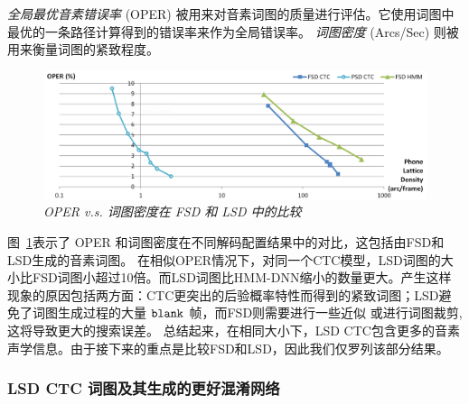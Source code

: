 {\em 全局最优音素错误率} (OPER) 被用来对音素词图的质量进行评估。它使用词图中最优的一条路径计算得到的错误率来作为全局错误率\cite{hoffmeister2006frame}。 {\em 词图密度} (Arcs/Sec) 则被用来衡量词图的紧致程度\cite{woodland1994large}。

\begin{figure}[tbhp!]
        \centering
        \includegraphics[width=\linewidth]{figure/OPER-latden.png}

        \caption{{\it OPER v.s. 词图密度在 FSD 和 LSD 中的比较}}
        \label{fig:OPER-latden}
      \end{figure}

图~\ref{fig:OPER-latden}表示了 OPER 和词图密度在不同解码配置结果中的对比，这包括由FSD和LSD生成的音素词图。
在相似OPER情况下，对同一个CTC模型，LSD词图的大小比FSD词图小超过10倍。而LSD词图比HMM-DNN缩小的数量更大。产生这样现象的原因包括两方面：CTC更突出的后验概率特性而得到的紧致词图；LSD避免了词图生成过程的大量 $\tt blank$ 帧，而FSD则需要进行一些近似 \cite{ljolje1999efficient} 或进行词图裁剪\cite{povey2012generating}, 这将导致更大的搜索误差。
总结起来，在相同大小下，LSD CTC包含更多的音素声学信息。由于接下来的重点是比较FSD和LSD，因此我们仅罗列该部分结果。


\subsubsection{LSD CTC 词图及其生成的更好混淆网络}


